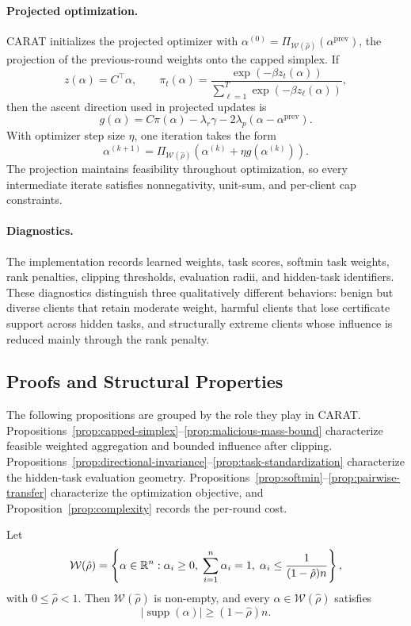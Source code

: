 \paragraph{Projected optimization.}
CARAT initializes the projected optimizer with $\alpha^{(0)}=\Pi_{\mathcal{W}(\hat{\rho})}(\alpha^{\mathrm{prev}})$, the projection of the previous-round weights onto the capped simplex. If
\[
z(\alpha)=C^\top \alpha,
\qquad
\pi_t(\alpha)=\frac{\exp(-\beta z_t(\alpha))}{\sum_{\ell=1}^T \exp(-\beta z_\ell(\alpha))},
\]
then the ascent direction used in projected updates is
\[
g(\alpha)=C\pi(\alpha)-\lambda_r \gamma-2\lambda_p(\alpha-\alpha^{\mathrm{prev}}).
\]
With optimizer step size $\eta$, one iteration takes the form
\[
\alpha^{(k+1)}=
\Pi_{\mathcal{W}(\hat{\rho})}
\left(\alpha^{(k)}+\eta g(\alpha^{(k)})\right).
\]
The projection maintains feasibility throughout optimization, so every intermediate iterate satisfies nonnegativity, unit-sum, and per-client cap constraints.

\paragraph{Diagnostics.}
The implementation records learned weights, task scores, softmin task weights, rank penalties, clipping thresholds, evaluation radii, and hidden-task identifiers. These diagnostics distinguish three qualitatively different behaviors: benign but diverse clients that retain moderate weight, harmful clients that lose certificate support across hidden tasks, and structurally extreme clients whose influence is reduced mainly through the rank penalty.

\subsection{Proofs and Structural Properties}
\label{sec:appendix-theory}

The following propositions are grouped by the role they play in CARAT. Propositions~\ref{prop:capped-simplex}--\ref{prop:malicious-mass-bound} characterize feasible weighted aggregation and bounded influence after clipping. Propositions~\ref{prop:directional-invariance}--\ref{prop:task-standardization} characterize the hidden-task evaluation geometry. Propositions~\ref{prop:softmin}--\ref{prop:pairwise-transfer} characterize the optimization objective, and Proposition~\ref{prop:complexity} records the per-round cost.

\begin{proposition}
\label{prop:capped-simplex}
Let
\[
\mathcal{W}(\hat{\rho})=
\left\{
\alpha \in \mathbb{R}^n:
\alpha_i \ge 0,\;
\sum_{i=1}^n \alpha_i = 1,\;
\alpha_i \le \frac{1}{(1-\hat{\rho})n}
\right\},
\]
with $0\le\hat{\rho}<1$. Then $\mathcal{W}(\hat{\rho})$ is non-empty, and every $\alpha \in \mathcal{W}(\hat{\rho})$ satisfies
\[
|\operatorname{supp}(\alpha)| \ge (1-\hat{\rho})n.
\]
\end{proposition}

